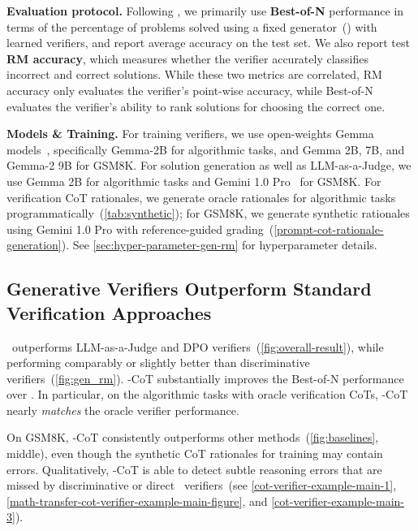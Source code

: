 \textbf{Evaluation protocol.} Following \citet{cobbe2021training, lightman2023let}, we primarily use \textbf{Best-of-N} performance in terms of the percentage of problems solved using a fixed generator~() with learned verifiers, and report average accuracy on the test set. %
We also report test \textbf{RM accuracy}, which measures whether the verifier accurately classifies incorrect and correct solutions. While these two metrics are correlated, RM accuracy only evaluates the verifier's point-wise accuracy, while Best-of-N evaluates the verifier's ability to rank solutions for choosing the correct one. %

\textbf{Models \& Training.} For training verifiers, we use open-weights Gemma models~\citep{gemma, team2024gemma}, specifically Gemma-2B for algorithmic tasks, and Gemma 2B, 7B, and Gemma-2 9B for GSM8K. For solution generation as well as LLM-as-a-Judge, we use Gemma 2B for algorithmic tasks and Gemini 1.0 Pro~\citep{team2023gemini} for GSM8K. For verification CoT rationales, we generate oracle rationales for algorithmic tasks programmatically~(\autoref{tab:synthetic}); for GSM8K, we generate synthetic rationales using Gemini 1.0 Pro with reference-guided grading~(\autoref{prompt-cot-rationale-generation}).  %
See \autoref{sec:hyper-parameter-gen-rm} for hyperparameter details.

\subsection{Generative Verifiers Outperform Standard Verification Approaches}

\genV\ outperforms LLM-as-a-Judge and DPO verifiers~(\autoref{fig:overall-result}), while performing comparably or slightly better than discriminative verifiers~(\autoref{fig:gen_rm}). \genV-CoT substantially improves the Best-of-N performance over \genV. In particular, on the algorithmic tasks with oracle verification CoTs, \genV-CoT nearly \emph{matches} the oracle verifier performance. 

On GSM8K, \genV-CoT consistently outperforms other methods~(\autoref{fig:baselines}, middle), even though the synthetic CoT rationales for training may contain errors. Qualitatively, {\genV-CoT} is able to detect subtle reasoning errors that are missed by discriminative or direct \genV\ verifiers~(see \autoref{cot-verifier-example-main-1},  \ref{math-transfer-cot-verifier-example-main-figure}, and \ref{cot-verifier-example-main-3}). 

